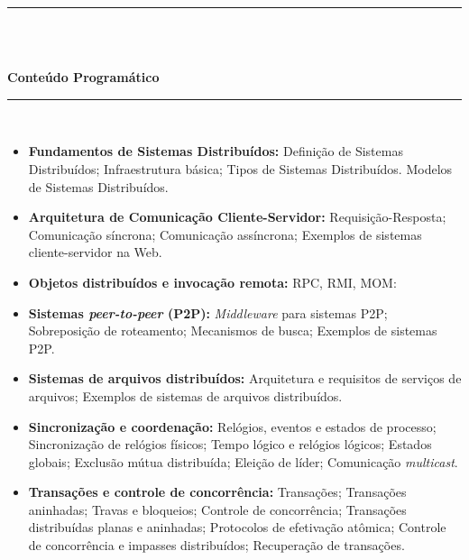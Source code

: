 \noindent\rule{16.5cm}{0.4pt}\\
\\
\vspace{-12mm}
\begin{center}\textbf{Conteúdo Programático}\end{center}
\vspace{-5mm}
\noindent\rule{16.5cm}{0.4pt}
\\
\begin{itemize}
 \item \textbf{Fundamentos de Sistemas Distribuídos:} Definição de Sistemas Distribuídos; Infraestrutura básica; Tipos de Sistemas Distribuídos. Modelos de Sistemas Distribu\'idos.


 \item \textbf{Arquitetura de Comunicação Cliente-Servidor:} Requisição-Resposta; Comunicação síncrona; Comunicação assíncrona; Exemplos de sistemas cliente-servidor na Web.
  
 \item \textbf{Objetos distribu\'idos e invoca\c{c}\~ao remota:} RPC, RMI, MOM:

 \item \textbf{Sistemas \textit{peer-to-peer} (P2P):} \textit{Middleware} para sistemas P2P; Sobreposi\c{c}\~ao de roteamento; Mecanismos de busca; Exemplos de sistemas P2P.

 \item \textbf{Sistemas de arquivos distribuídos:} Arquitetura e requisitos de servi\c{c}os de arquivos; Exemplos de sistemas de arquivos distribu\'idos.

 \item \textbf{Sincronização e coordena\c{c}\~ao:} Rel\'ogios, eventos e estados de processo; Sincroniza\c{c}\~ao de rel\'ogios f\'isicos; Tempo l\'ogico e rel\'ogios l\'ogicos; Estados globais; Exclus\~ao m\'utua distribu\'ida; Elei\c{c}\~ao de l\'ider; Comunica\c{c}\~ao \textit{multicast}.

 \item \textbf{Transações e controle de concorr\^encia:} Transa\c{c}\~oes; Transa\c{c}\~oes aninhadas; Travas e bloqueios; Controle de concorr\^encia; Transa\c{c}\~oes distribu\'idas planas e aninhadas; Protocolos de efetiva\c{c}\~ao at\^omica; Controle de concorr\^encia e impasses distribu\'idos; Recupera\c{c}\~ao de transa\c{c}\~oes.


\end{itemize}
